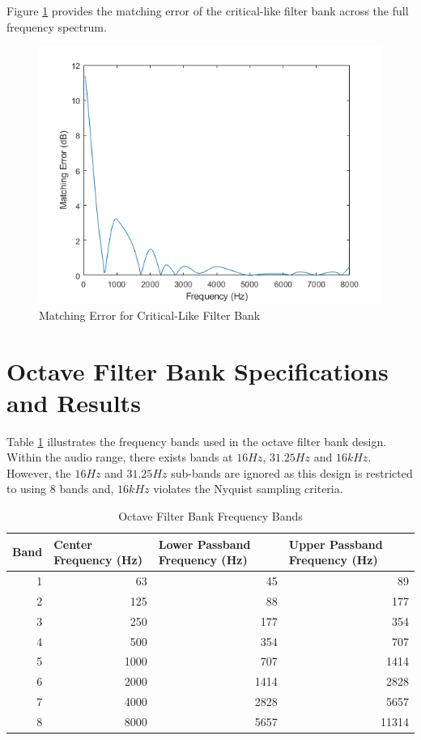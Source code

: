 \documentclass[11pt,onecolumn]{witseiepaper}
\begin{document}
\begin{appendices}
\noindent Figure \ref{fig:critMatErr} provides the matching error of the critical-like filter bank across the full frequency spectrum.

\begin{figure}[h]
\centering
\includegraphics[width=0.6\linewidth]{critMatErr.PNG}
\caption{Matching Error for Critical-Like Filter Bank}
\label{fig:critMatErr}
\end{figure}  




\section{Octave Filter Bank Specifications and Results}
\label{app:octFreqBands}

\noindent Table \ref{tab:octFreqBands} illustrates the frequency bands used in the octave filter bank design. Within the audio range, there exists bands at $16Hz$, $31.25Hz$ and $16kHz$. However, the $16Hz$ and $31.25Hz$ sub-bands are ignored as this design is restricted to using $8$ bands and, $16kHz$ violates the Nyquist sampling criteria.

\begin{table}[htbp]
  \centering
  \caption{Octave Filter Bank Frequency Bands}
  \begin{adjustbox}{width=\linewidth}
    \begin{tabular}{|r|r|r|r|}
    \hline
    \multicolumn{1}{|l|}{\textbf{Band}} & \multicolumn{1}{l|}{\textbf{Center Frequency (Hz)}} & \multicolumn{1}{l|}{\textbf{Lower Passband Frequency (Hz)}} & \multicolumn{1}{l|}{\textbf{Upper Passband Frequency (Hz)}} \\
    \hline
    1     & 63    & 45    & 89 \\
    \hline
    2     & 125   & 88    & 177 \\
    \hline
    3     & 250   & 177   & 354 \\
    \hline
    4     & 500   & 354   & 707 \\
    \hline
    5     & 1000  & 707   & 1414 \\
    \hline
    6     & 2000  & 1414  & 2828 \\
    \hline
    7     & 4000  & 2828  & 5657 \\
    \hline
    8     & 8000  & 5657  & 11314 \\
    \hline
    \end{tabular}%
    \end{adjustbox}
  \label{tab:octFreqBands}%
\end{table}%


\end{appendices}
\end{document}
